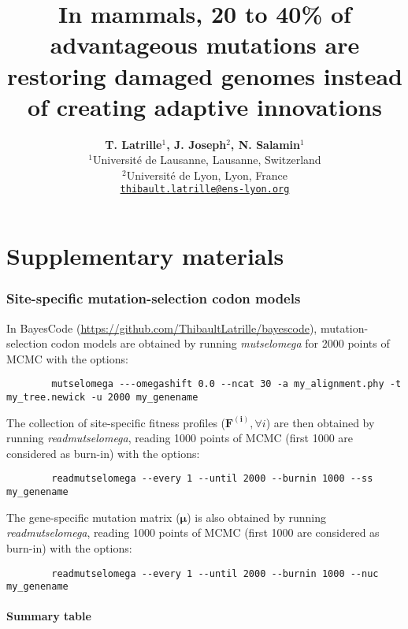 \documentclass{article}
\title{In mammals, 20 to 40\% of advantageous mutations are restoring damaged genomes instead of creating adaptive innovations}
\author{
    \large
    \textbf{T. {Latrille}$^{1}$, J. {Joseph}$^{2}$, N. {Salamin}$^{1}$}\\
    \normalsize $^{1}$Université de Lausanne, Lausanne, Switzerland\\
    \normalsize $^{2}$Université de Lyon, Lyon, France \\
    \normalsize \texttt{\href{mailto:thibault.latrille@ens-lyon.org}{thibault.latrille@ens-lyon.org}} \\
}
\newcommand{\UniDimArray}[1]{\bm{#1}}
\begin{document}
    \maketitle
    \part*{Supplementary materials}
    \tableofcontents
    \clearpage


    \section{Site-specific mutation-selection codon models}

    In BayesCode (\url{https://github.com/ThibaultLatrille/bayescode}), mutation-selection codon models are obtained by running \textit{mutselomega} for 2000 points of MCMC with the options:
    \begin{scriptsize}
        \begin{verbatim}
        mutselomega ---omegashift 0.0 --ncat 30 -a my_alignment.phy -t my_tree.newick -u 2000 my_genename
        \end{verbatim}
    \end{scriptsize}
    The collection of site-specific fitness profiles ($\UniDimArray{F^{(i)}}, \forall i$) are then obtained by running \textit{readmutselomega}, reading 1000 points of MCMC (first 1000 are considered as burn-in) with the options:
    \begin{scriptsize}
        \begin{verbatim}
        readmutselomega --every 1 --until 2000 --burnin 1000 --ss my_genename
        \end{verbatim}
    \end{scriptsize}
    The gene-specific mutation matrix ($\UniDimArray{\mu}$) is also obtained by running \textit{readmutselomega}, reading 1000 points of MCMC (first 1000 are considered as burn-in) with the options:
    \begin{scriptsize}
        \begin{verbatim}
        readmutselomega --every 1 --until 2000 --burnin 1000 --nuc my_genename
        \end{verbatim}
    \end{scriptsize}

    \subsection{Summary table}
\end{document}
